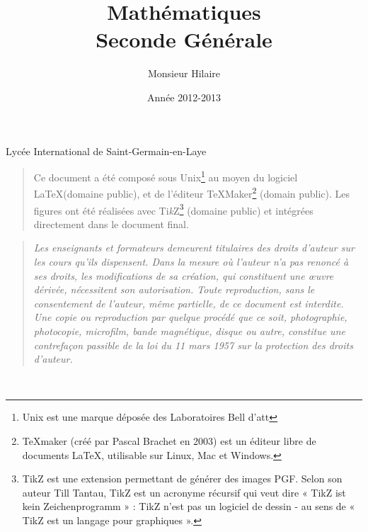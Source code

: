 


\ifdefined\COMPLETE
\else
    \newcommand{\COMPLETE}
\fi                        %


\usepackage{textcomp}

\title {  \Huge     Mathématiques\\
             Seconde Générale \\
       }

\author{ \Large   Monsieur Hilaire  }

\date  { \large  Année 2012-2013   }





\maketitle\thispagestyle{empty} %
\vfill

\centerline {\large  Lycée International de Saint-Germain-en-Laye} 

\newpage

\thispagestyle{empty}

\def\TikZ{{\fontfamily{cmr}Ti{\em k}Z}} 
    \begin {quote}
    Ce document a été composé sous  Unix\footnote{Unix  est une
    marque déposée des  Laboratoires  Bell d'{\sc att}} au moyen  
    du logiciel \LaTeX (domaine  public),
    et de l'éditeur {\TeX}{Maker}\footnote{TeXmaker (créé par Pascal Brachet en 2003) est un éditeur libre de documents LaTeX, utilisable sur Linux, Mac et Windows.} (domain public). 
    Les figures ont été réalisées avec {\TikZ}\footnote{TikZ est une extension permettant de générer des images PGF. Selon son auteur Till Tantau, TikZ est un acronyme récursif qui veut dire « TikZ ist kein Zeichenprogramm » : TikZ n'est pas un logiciel de dessin - au sens de « TikZ est un langage pour graphiques ».} (domaine
    public)  et  intégrées  directement  dans le  document  final.
    \end {quote}

    \vspace {15cm}

    \begin {quote}
    \em Les enseignants et formateurs demeurent titulaires des droits d'auteur sur les cours qu'ils dispensent.    
Dans la mesure où l'auteur n'a pas renoncé à ses droits, les modifications de sa création, qui constituent une œuvre dérivée, nécessitent son autorisation. 
    Toute  reproduction,  sans le consentement de l'auteur, 
    même  partielle,  de ce document est
    interdite.  Une copie ou reproduction  par quelque procédé que
    ce   soit,   photographie,    photocopie,   microfilm,   bande
    magnétique,   disque  ou  autre,   constitue  une  contrefaçon
    passible  de la loi du 11  mars  1957  sur la  protection  des
    droits d'auteur.
    \end {quote}
\newpage

\setcounter{page}{1}

\tableofcontents
\newpage
~ %
\newpage





